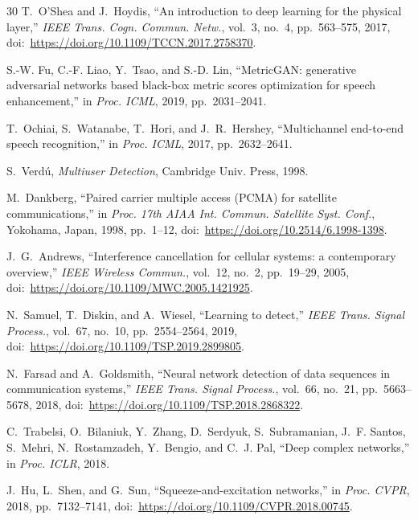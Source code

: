 \documentclass[review,12pt]{elsarticle}
\begin{document}
\begin{thebibliography}{30}
T.~O'Shea and J.~Hoydis,
``An introduction to deep learning for the physical layer,''
\emph{IEEE Trans. Cogn. Commun. Netw.}, vol.~3, no.~4, pp.~563--575,
2017, doi:~\url{https://doi.org/10.1109/TCCN.2017.2758370}.

S.-W. Fu, C.-F. Liao, Y.~Tsao, and S.-D. Lin,
``MetricGAN: generative adversarial networks based black-box metric
scores optimization for speech enhancement,''
in \emph{Proc. ICML}, 2019, pp.~2031--2041.

T.~Ochiai, S.~Watanabe, T.~Hori, and J.~R.~Hershey,
``Multichannel end-to-end speech recognition,''
in \emph{Proc. ICML}, 2017, pp.~2632--2641.

S.~Verd{\'u},
\emph{Multiuser Detection},
Cambridge Univ. Press, 1998.

M.~Dankberg,
``Paired carrier multiple access (PCMA) for satellite communications,''
in \emph{Proc. 17th AIAA Int. Commun. Satellite Syst. Conf.},
Yokohama, Japan, 1998, pp.~1--12,
doi:~\url{https://doi.org/10.2514/6.1998-1398}.

J.~G.~Andrews,
``Interference cancellation for cellular systems: a contemporary
overview,''
\emph{IEEE Wireless Commun.}, vol.~12, no.~2, pp.~19--29, 2005,
doi:~\url{https://doi.org/10.1109/MWC.2005.1421925}.

N.~Samuel, T.~Diskin, and A.~Wiesel,
``Learning to detect,''
\emph{IEEE Trans. Signal Process.}, vol.~67, no.~10, pp.~2554--2564,
2019, doi:~\url{https://doi.org/10.1109/TSP.2019.2899805}.

N.~Farsad and A.~Goldsmith,
``Neural network detection of data sequences in communication systems,''
\emph{IEEE Trans. Signal Process.}, vol.~66, no.~21, pp.~5663--5678,
2018, doi:~\url{https://doi.org/10.1109/TSP.2018.2868322}.

C.~Trabelsi, O.~Bilaniuk, Y.~Zhang, D.~Serdyuk, S.~Subramanian,
J.~F. Santos, S.~Mehri, N.~Rostamzadeh, Y.~Bengio, and C.~J. Pal,
``Deep complex networks,''
in \emph{Proc. ICLR}, 2018.

J.~Hu, L.~Shen, and G.~Sun,
``Squeeze-and-excitation networks,''
in \emph{Proc. CVPR}, 2018, pp.~7132--7141,
doi:~\url{https://doi.org/10.1109/CVPR.2018.00745}.

\end{thebibliography}
\end{document}
